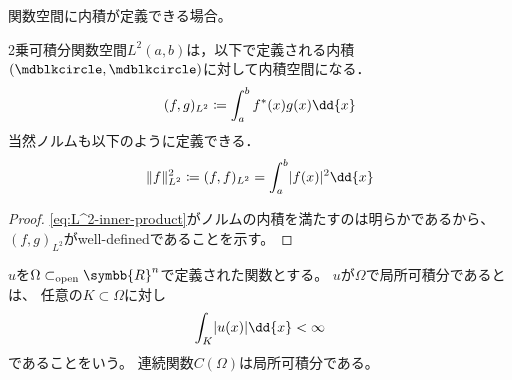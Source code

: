 \documentclass[../sotsu.tex]{subfiles}
\begin{document}
関数空間に内積が定義できる場合。

\begin{proposition}
    2乗可積分関数空間$L^2 (a, b)$は，以下で定義される内積$(\bigdot, \bigdot)$に対して内積空間になる．
    \begin{align}
        \label{eq:L^2-inner-product}
        (f, g)_{L^2} \coloneq \int_a^b \conj{f}(x) g(x) \dd{x}
    \end{align}
    当然ノルムも以下のように定義できる．
    \begin{align}
        \norm{f}_{L^2}^2 \coloneq (f, f)_{L^2} = \int_a^b \abs{f(x)}^2 \dd{x}
    \end{align}
\end{proposition}

\begin{proof}
    \cref{eq:L^2-inner-product}がノルムの内積を満たすのは明らかであるから、
    $(f, g)_{L^2}$がwell-definedであることを示す。
    
\end{proof}


$u$を$\Omega \subset_{\text{open}} \symbb{R}^n$で定義された関数とする。
$u$が$\Omega$で局所可積分であるとは、
任意の$K \subset \Omega$に対し
\begin{equation*}
    \int_K \abs{ u(x) } \dd{x} < \infty
\end{equation*}
であることをいう。
連続関数$C(\Omega)$は局所可積分である。
\end{document}

